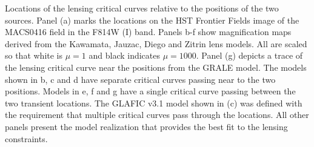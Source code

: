 \label{fig:SpockCriticalCurves}
Locations of the lensing critical curves relative to the positions of
the two \spock sources. Panel (a) marks the \spock locations on the
HST Frontier Fields image of the MACS0416 field in the F814W (I) band.
Panels b-f show magnification maps derived from the Kawamata, Jauzac,
Diego and Zitrin lens models.  All are scaled so that white is $\mu=1$
and black indicates $\mu=1000$.  Panel (g) depicts a trace of the
lensing critical curve near the \spock positions from the GRALE
model. The models shown in b, c and d have separate critical curves
passing near to the two \spock positions. Models in e, f and g have a
single critical curve passing between the two transient locations.
The GLAFIC v3.1 model shown in (c) was defined with the requirement
that multiple critical curves pass through the \spock locations.  All
other panels present the model realization that provides the best fit
to the lensing constraints.
  
